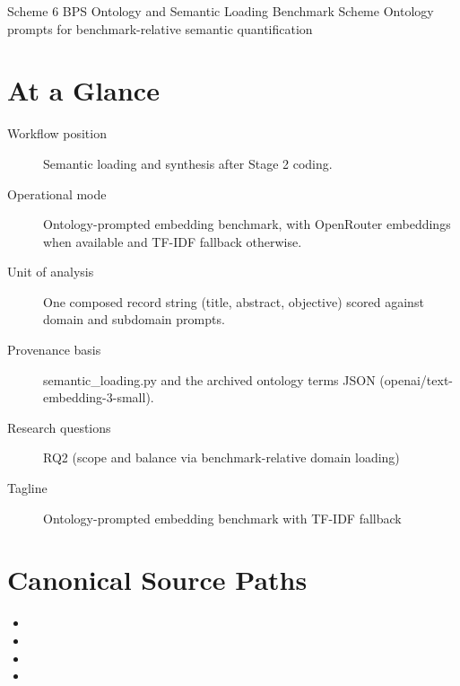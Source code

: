 \documentclass[11pt]{article}
\begin{document}
\schemeheader
  {Scheme 6}
  {BPS Ontology and Semantic Loading Benchmark Scheme}
  {Ontology prompts for benchmark-relative semantic quantification}


\section*{At a Glance}
\begin{description}
\item[Workflow position] Semantic loading and synthesis after Stage 2 coding.
\item[Operational mode] Ontology-prompted embedding benchmark, with OpenRouter embeddings when available and TF-IDF fallback otherwise.
\item[Unit of analysis] One composed record string (title, abstract, objective) scored against domain and subdomain prompts.
\item[Provenance basis] semantic\_loading.py and the archived ontology terms JSON (openai/text-embedding-3-small).
\item[Research questions] RQ2 (scope and balance via benchmark-relative domain loading)
\item[Tagline] Ontology-prompted embedding benchmark with TF-IDF fallback
\end{description}

\section*{Canonical Source Paths}
\begin{itemize}
\item {}
\item {}
\item {}
\item {}
\end{itemize}
\end{document}
